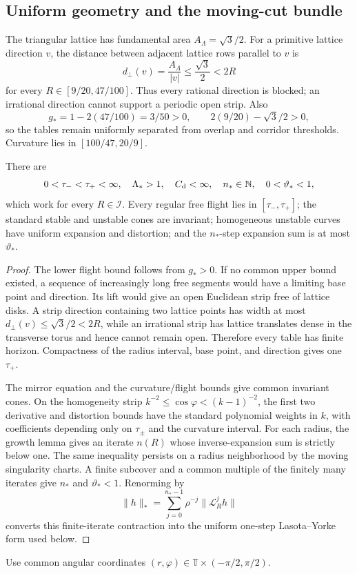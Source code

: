 \subsection{Uniform geometry and the moving-cut bundle}

The triangular lattice has fundamental area \(A_\Lambda=\sqrt3/2\).  For a primitive lattice direction \(v\), the distance between adjacent lattice rows
parallel to \(v\) is
\[
 d_\perp(v)=\frac{A_\Lambda}{|v|}
 \le\frac{\sqrt3}{2}<2R
\]
for every \(R\in[9/20,47/100]\).  Thus every rational direction is blocked;
an irrational direction cannot support a periodic open strip.  Also
\[
 g_*=1-2(47/100)=3/50>0,
 \qquad
 2(9/20)-\sqrt3/2>0,
\]
so the tables remain uniformly separated from overlap and corridor
thresholds.  Curvature lies in \([100/47,20/9]\).

\begin{lemma}
\label{lem:r3-a2-geometry}
There are
\[
 0<\tau_-<\tau_+<\infty,
 \quad \Lambda_*>1,
 \quad C_{\rm d}<\infty,
 \quad n_*\in\mathbb N,
 \quad 0<\vartheta_*<1,
\]
which work for every \(R\in\mathcal I\).  Every regular free flight lies in
\([\tau_-,\tau_+]\); the standard stable and unstable cones are invariant;
homogeneous unstable curves have uniform expansion and distortion; and the
\(n_*\)-step expansion sum is at most \(\vartheta_*\).
\end{lemma}

\begin{proof}
The lower flight bound follows from \(g_*>0\).  If no common upper bound
existed, a sequence of increasingly long free segments would have a limiting
base point and direction.  Its lift would give an open Euclidean strip free of
lattice disks.  A strip direction containing two lattice points has width at
most \(d_\perp(v)\le\sqrt3/2<2R\), while an irrational strip has lattice
translates dense in the transverse torus and hence cannot remain open.
Therefore every table has finite horizon.  Compactness of the radius interval,
base point, and direction gives one \(\tau_+\).

The mirror equation and the curvature/flight bounds give common invariant
cones.  On the homogeneity strip
\(k^{-2}\le\cos\varphi<(k-1)^{-2}\), the first two derivative and distortion
bounds have the standard polynomial weights in \(k\), with coefficients
depending only on \(\tau_\pm\) and the curvature interval.  For each radius,
the growth lemma gives an iterate \(n(R)\) whose inverse-expansion sum is
strictly below one.  The same inequality persists on a radius neighborhood by
the moving singularity charts.  A finite subcover and a common multiple of
the finitely many iterates give \(n_*\) and \(\vartheta_*<1\).  Renorming by
\[
 \|h\|_*=
 \sum_{j=0}^{n_*-1}\rho^{-j}\|\mathcal L_R^jh\|
\]
converts this finite-iterate contraction into the uniform one-step
Lasota--Yorke form used below.
\end{proof}

Use common angular coordinates \((r,\varphi)\in\mathbb T\times
(-\pi/2,\pi/2)\).